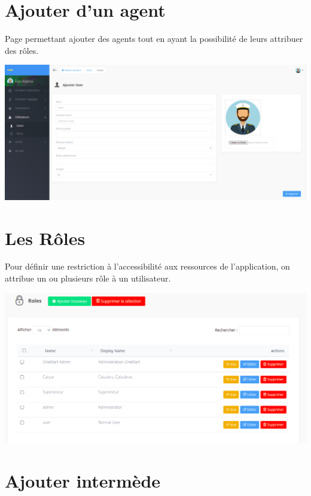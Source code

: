 	\section{Ajouter d'un agent}
		Page permettant ajouter des agents tout en ayant la possibilité de leurs attribuer des rôles.
		\begin{center}
			\includegraphics[scale=0.4]{chap_3/ajouter_agent.png}
			\label{ajouter_agents}
		\end{center}
	\section{Les Rôles}
		Pour définir une restriction à l'accessibilité aux ressources de l'application, on attribue un ou plusieurs rôle à un utilisateur.
		\begin{center}
			\includegraphics[scale=0.4]{chap_3/roles.png}
			\label{les_roles}
		\end{center}
	\section{Ajouter intermède}
